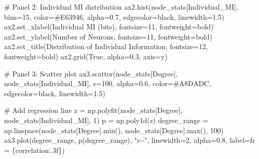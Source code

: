 \documentclass[
  11pt,
  letterpaper,
  oneside,
  openany]{book}
\newenvironment{Shaded}{\begin{snugshade}}{\end{snugshade}}
\newcommand{\BuiltInTok}[1]{\textcolor[rgb]{0.00,0.23,0.31}{#1}}
\newcommand{\CommentTok}[1]{\textcolor[rgb]{0.37,0.37,0.37}{#1}}
\newcommand{\DecValTok}[1]{\textcolor[rgb]{0.68,0.00,0.00}{#1}}
\newcommand{\FloatTok}[1]{\textcolor[rgb]{0.68,0.00,0.00}{#1}}
\newcommand{\NormalTok}[1]{\textcolor[rgb]{0.00,0.23,0.31}{#1}}
\newcommand{\OperatorTok}[1]{\textcolor[rgb]{0.37,0.37,0.37}{#1}}
\newcommand{\SpecialCharTok}[1]{\textcolor[rgb]{0.37,0.37,0.37}{#1}}
\newcommand{\SpecialStringTok}[1]{\textcolor[rgb]{0.13,0.47,0.30}{#1}}
\newcommand{\StringTok}[1]{\textcolor[rgb]{0.13,0.47,0.30}{#1}}
\newcommand{\VariableTok}[1]{\textcolor[rgb]{0.07,0.07,0.07}{#1}}
\begin{document}
\begin{Shaded}
\begin{Highlighting}[]
\CommentTok{\# Panel 2: Individual MI distribution  }
\NormalTok{ax2.hist(node\_stats[}\StringTok{\textquotesingle{}Individual\_MI\textquotesingle{}}\NormalTok{], bins}\OperatorTok{=}\DecValTok{15}\NormalTok{, color}\OperatorTok{=}\StringTok{\textquotesingle{}\#E63946\textquotesingle{}}\NormalTok{, }
\NormalTok{         alpha}\OperatorTok{=}\FloatTok{0.7}\NormalTok{, edgecolor}\OperatorTok{=}\StringTok{\textquotesingle{}black\textquotesingle{}}\NormalTok{, linewidth}\OperatorTok{=}\FloatTok{1.5}\NormalTok{)}
\NormalTok{ax2.set\_xlabel(}\StringTok{\textquotesingle{}Individual MI (bits)\textquotesingle{}}\NormalTok{, fontsize}\OperatorTok{=}\DecValTok{11}\NormalTok{, fontweight}\OperatorTok{=}\StringTok{\textquotesingle{}bold\textquotesingle{}}\NormalTok{)}
\NormalTok{ax2.set\_ylabel(}\StringTok{\textquotesingle{}Number of Neurons\textquotesingle{}}\NormalTok{, fontsize}\OperatorTok{=}\DecValTok{11}\NormalTok{, fontweight}\OperatorTok{=}\StringTok{\textquotesingle{}bold\textquotesingle{}}\NormalTok{)}
\NormalTok{ax2.set\_title(}\StringTok{\textquotesingle{}Distribution of Individual Information\textquotesingle{}}\NormalTok{, fontsize}\OperatorTok{=}\DecValTok{12}\NormalTok{, fontweight}\OperatorTok{=}\StringTok{\textquotesingle{}bold\textquotesingle{}}\NormalTok{)}
\NormalTok{ax2.grid(}\VariableTok{True}\NormalTok{, alpha}\OperatorTok{=}\FloatTok{0.3}\NormalTok{, axis}\OperatorTok{=}\StringTok{\textquotesingle{}y\textquotesingle{}}\NormalTok{)}

\CommentTok{\# Panel 3: Scatter plot}
\NormalTok{ax3.scatter(node\_stats[}\StringTok{\textquotesingle{}Degree\textquotesingle{}}\NormalTok{], node\_stats[}\StringTok{\textquotesingle{}Individual\_MI\textquotesingle{}}\NormalTok{], }
\NormalTok{            s}\OperatorTok{=}\DecValTok{100}\NormalTok{, alpha}\OperatorTok{=}\FloatTok{0.6}\NormalTok{, color}\OperatorTok{=}\StringTok{\textquotesingle{}\#A8DADC\textquotesingle{}}\NormalTok{, edgecolor}\OperatorTok{=}\StringTok{\textquotesingle{}black\textquotesingle{}}\NormalTok{, linewidth}\OperatorTok{=}\FloatTok{1.5}\NormalTok{)}

\CommentTok{\# Add regression line}
\NormalTok{z }\OperatorTok{=}\NormalTok{ np.polyfit(node\_stats[}\StringTok{\textquotesingle{}Degree\textquotesingle{}}\NormalTok{], node\_stats[}\StringTok{\textquotesingle{}Individual\_MI\textquotesingle{}}\NormalTok{], }\DecValTok{1}\NormalTok{)}
\NormalTok{p }\OperatorTok{=}\NormalTok{ np.poly1d(z)}
\NormalTok{degree\_range }\OperatorTok{=}\NormalTok{ np.linspace(node\_stats[}\StringTok{\textquotesingle{}Degree\textquotesingle{}}\NormalTok{].}\BuiltInTok{min}\NormalTok{(), node\_stats[}\StringTok{\textquotesingle{}Degree\textquotesingle{}}\NormalTok{].}\BuiltInTok{max}\NormalTok{(), }\DecValTok{100}\NormalTok{)}
\NormalTok{ax3.plot(degree\_range, p(degree\_range), }\StringTok{"r{-}{-}"}\NormalTok{, linewidth}\OperatorTok{=}\DecValTok{2}\NormalTok{, alpha}\OperatorTok{=}\FloatTok{0.8}\NormalTok{,}
\NormalTok{         label}\OperatorTok{=}\SpecialStringTok{f\textquotesingle{}r = }\SpecialCharTok{\{}\NormalTok{correlation}\SpecialCharTok{:.3f\}}\SpecialStringTok{\textquotesingle{}}\NormalTok{)}


\end{Highlighting}
\end{Shaded}
\end{document}
